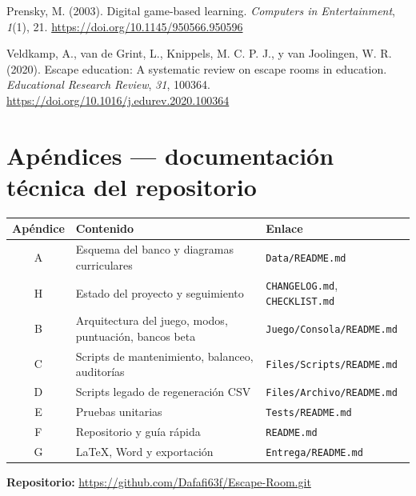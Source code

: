\documentclass[11pt,a4paper]{article}
\newcommand{\tfgrepo}{\url{https://github.com/Dafafi63f/Escape-Room.git}}
\begin{document}
Prensky, M. (2003). Digital game-based learning. \textit{Computers in Entertainment}, \textit{1}(1), 21. \url{https://doi.org/10.1145/950566.950596}

Veldkamp, A., van de Grint, L., Knippels, M. C. P. J., y van Joolingen, W. R. (2020). Escape education: A systematic review on escape rooms in education. \textit{Educational Research Review}, \textit{31}, 100364. \url{https://doi.org/10.1016/j.edurev.2020.100364}

\section{Apéndices — documentación técnica del repositorio}
\renewcommand{\arraystretch}{1.08}
\begin{tabularx}{\textwidth}{@{}c>{\raggedright\arraybackslash}X>{\raggedright\arraybackslash}p{4.2cm}@{}}
\toprule
\textbf{Apéndice} & \textbf{Contenido} & \textbf{Enlace} \\
\midrule
A & Esquema del banco y diagramas curriculares & \texttt{Data/README.md} \\
H & Estado del proyecto y seguimiento & \texttt{CHANGELOG.md}, \texttt{CHECKLIST.md} \\
B & Arquitectura del juego, modos, puntuación, bancos beta & \texttt{Juego/Consola/README.md} \\
C & Scripts de mantenimiento, balanceo, auditorías & \texttt{Files/Scripts/README.md} \\
D & Scripts legado de regeneración CSV & \texttt{Files/Archivo/README.md} \\
E & Pruebas unitarias & \texttt{Tests/README.md} \\
F & Repositorio y guía rápida & \texttt{README.md} \\
G & LaTeX, Word y exportación & \texttt{Entrega/README.md} \\
\bottomrule
\end{tabularx}

\medskip
\noindent\textbf{Repositorio:} \tfgrepo
\end{document}
